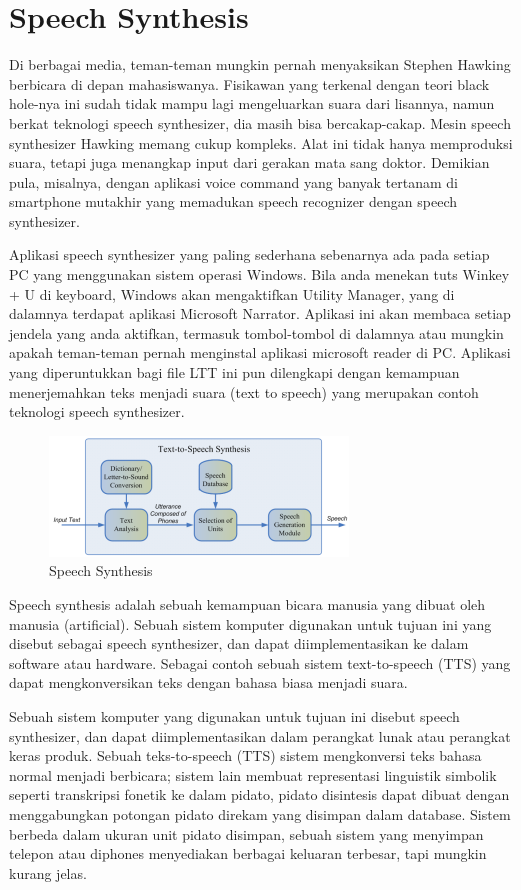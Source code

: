 \section{Speech Synthesis}
Di berbagai media, teman-teman mungkin pernah menyaksikan Stephen Hawking berbicara di depan mahasiswanya. Fisikawan yang terkenal dengan teori black hole-nya ini sudah tidak mampu lagi mengeluarkan suara dari lisannya, namun berkat teknologi speech synthesizer, dia masih bisa bercakap-cakap. Mesin speech synthesizer Hawking memang cukup kompleks. Alat ini tidak hanya memproduksi suara, tetapi juga menangkap input dari gerakan mata sang doktor. Demikian pula, misalnya, dengan aplikasi voice command yang banyak tertanam di smartphone mutakhir yang memadukan speech recognizer dengan speech synthesizer.

Aplikasi speech synthesizer yang paling sederhana sebenarnya ada pada setiap PC yang menggunakan sistem operasi Windows. Bila anda menekan tuts Winkey + U di keyboard, Windows akan mengaktifkan Utility Manager, yang di dalamnya terdapat aplikasi Microsoft Narrator. Aplikasi ini akan membaca setiap jendela yang anda aktifkan, termasuk tombol-tombol di dalamnya atau mungkin apakah teman-teman pernah menginstal aplikasi microsoft reader di PC. Aplikasi yang diperuntukkan bagi file LTT ini pun dilengkapi dengan kemampuan menerjemahkan teks menjadi suara (text to speech) yang merupakan contoh teknologi speech synthesizer.

\begin{figure}[H]
        \centerline{\includegraphics[scale=.75]{figures/speech}}
        \caption{Speech Synthesis}
		\label{speech}
\end{figure}

Speech synthesis adalah sebuah kemampuan bicara manusia yang dibuat oleh manusia (artificial). Sebuah sistem komputer digunakan untuk tujuan ini yang disebut sebagai speech synthesizer, dan dapat diimplementasikan ke dalam software atau hardware. Sebagai contoh sebuah sistem text-to-speech (TTS) yang dapat mengkonversikan teks dengan bahasa biasa menjadi suara\cite{8682816}.

Sebuah sistem komputer yang digunakan untuk tujuan ini disebut speech synthesizer, dan dapat diimplementasikan dalam perangkat lunak atau perangkat keras produk. Sebuah teks-to-speech (TTS) sistem mengkonversi teks bahasa normal menjadi berbicara; sistem lain membuat representasi linguistik simbolik seperti transkripsi fonetik ke dalam pidato, pidato disintesis dapat dibuat dengan menggabungkan potongan pidato direkam yang disimpan dalam database. Sistem berbeda dalam ukuran unit pidato disimpan, sebuah sistem yang menyimpan telepon atau diphones menyediakan berbagai keluaran terbesar, tapi mungkin kurang jelas\cite{li2017deep}.

